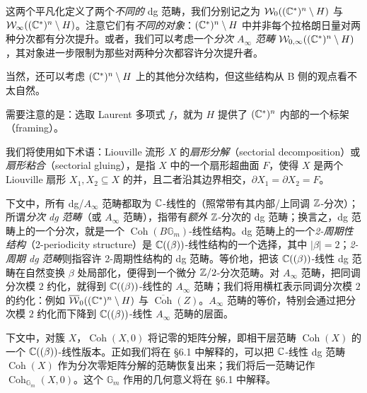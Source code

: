 这两个平凡化定义了两个\emph{不同的} dg 范畴，我们分别记之为 $\mathcal{W}_0((\mathbb{C}^*)^n\setminus H)$ 与 $\mathcal{W}_\infty((\mathbb{C}^*)^n\setminus H)$。注意它们有\emph{不同的对象}：$(\mathbb{C}^*)^n\setminus H$ 中并非每个拉格朗日量对两种分次都有分次提升。或者，我们可以考虑一个\emph{分次 $A_\infty$ 范畴} $\mathcal{W}_{0,\infty}((\mathbb{C}^*)^n\setminus H)$，其对象进一步限制为那些对两种分次都容许分次提升者。


当然，还可以考虑 $(\mathbb{C}^*)^n\setminus H$ 上的其他分次结构，但这些结构从 B 侧的观点看不太自然。

\begin{remarkx}\label{rem:framing}
需要注意的是：选取 Laurent 多项式 $f$，就为 $H$ 提供了 $(\mathbb{C}^*)^n$ 内部的一个标架（framing）。
\end{remarkx}

我们将使用如下术语：Liouville 流形 $X$ 的\emph{扇形分解}（sectorial decomposition）或\emph{扇形粘合}（sectorial gluing），是指 $X$ 中的一个扇形超曲面 $F$，使得 $X$ 是两个 Liouville 扇形 $X_1,X_2\subseteq X$ 的并，且二者沿其边界相交，$\partial X_1=\partial X_2=F$。

下文中，所有 dg/$A_\infty$ 范畴都取为 $\mathbb{C}$-线性的（照常带有其内部/上同调 $\mathbb{Z}$-分次）；所谓\emph{分次 dg 范畴}（或 $A_\infty$ 范畴），指带有\emph{额外} $\mathbb{Z}$-分次的 dg 范畴；换言之，dg 范畴上的一个分次，就是一个 $\operatorname{Coh}(B\mathbb G_m)$-线性结构。dg 范畴上的一个\emph{2-周期性结构}（2-periodicity structure）是 $\mathbb{C}((\beta))$-线性结构的一个选择，其中 $|\beta|=2$；\emph{2-周期 dg 范畴}则指容许 2-周期性结构的 dg 范畴。等价地，把该 $\mathbb{C}((\beta))$-线性 dg 范畴在自然变换 $\beta$ 处局部化，便得到一个微分 $\mathbb{Z}/2$-分次范畴。对 $A_\infty$ 范畴，把同调分次模 $2$ 约化，就得到 $\mathbb{C}((\beta))$-线性的 $A_\infty$ 范畴；我们将用横杠表示同调分次模 $2$ 的约化：例如 $\overline{\mathcal{W}}_0((\mathbb{C}^*)^n\setminus H)$ 与 $\overline{\operatorname{Coh}}(Z)$。$A_\infty$ 范畴的等价，特别会通过把分次模 $2$ 约化而下降到 $\mathbb{C}((\beta))$-线性 $A_\infty$ 范畴的层面。


下文中，对簇 $X$，$\operatorname{Coh}(X,0)$ 将记零的矩阵分解，即相干层范畴 $\operatorname{Coh}(X)$ 的一个 $\mathbb{C}((\beta))$-线性版本。正如我们将在 §6.1 中解释的，可以把 $\mathbb{C}$-线性 dg 范畴 $\operatorname{Coh}(X)$ 作为分次零矩阵分解的范畴恢复出来；我们将后一范畴记作 $\operatorname{Coh}_{\mathbb G_m}(X,0)$。这个 $\mathbb G_m$ 作用的几何意义将在 §6.1 中解释。

